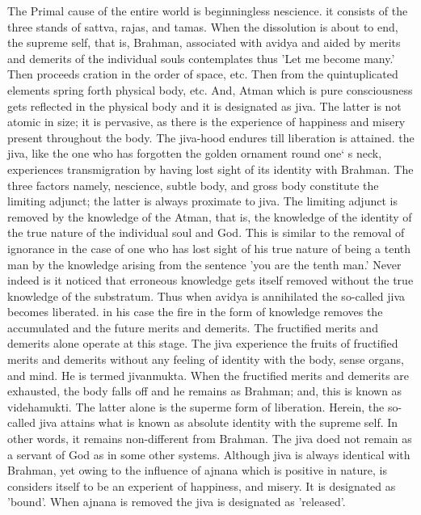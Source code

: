 The Primal cause of the entire world is beginningless nescience. it consists of the three stands of sattva, rajas, and tamas. When the dissolution is about to end, the supreme self, that is, Brahman, associated with avidya and aided by merits and demerits of the individual souls contemplates thus 'Let me become many.' Then proceeds cration in the order of space, etc. Then from the quintuplicated elements spring forth physical body, etc. And, Atman which is pure consciousness gets reflected in the physical body and it is designated as jiva. The latter is not atomic in size; it is pervasive, as there is the experience of happiness and misery present throughout the body. The jiva-hood endures till liberation is attained. the jiva, like the one who has forgotten the golden ornament round one` s neck, experiences transmigration by having lost sight of its identity with Brahman. The three factors namely, nescience, subtle body, and gross body constitute the limiting adjunct; the latter is always proximate to jiva. The limiting adjunct is removed by the knowledge of the Atman, that is, the knowledge of the identity of the true nature of the individual soul and God. This is similar to the removal of ignorance in the case of one who has lost sight of his true nature of being a tenth man by the knowledge arising from the sentence 'you are the tenth man.' Never indeed is it noticed that erroneous knowledge gets itself removed without the true knowledge of the substratum. Thus when avidya is annihilated the so-called jiva becomes liberated. in his case the fire in the form of knowledge removes the accumulated and the future merits and demerits. The fructified merits and demerits alone operate at this stage. The jiva experience the fruits of fructified merits and demerits without any feeling of identity with the body, sense organs, and mind. He is termed jivanmukta. When the fructified merits and demerits are exhausted, the body falls off and he remains as Brahman; and, this is known as videhamukti. The latter alone is the superme form of liberation. Herein, the so-called jiva attains what is known as absolute identity with the supreme self. In other words, it remains non-different from Brahman. The jiva doed not remain as a servant of God as in some other systems. Although jiva is always identical with Brahman, yet owing to the influence of ajnana which is positive in nature, is considers itself to be an experient of happiness, and misery. It is designated as 'bound'. When ajnana is removed the jiva is designated as 'released'.

